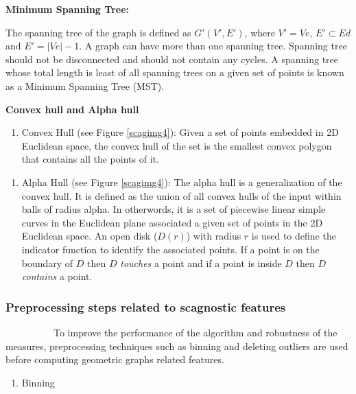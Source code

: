 \documentclass{article}
\begin{document}
\textbf{Minimum Spanning Tree:}

The spanning tree of the graph is defined as \(G'(V',E')\), where
\(V' = Ve\), \(E' \subset Ed\) and \(E' = |Ve|-1\). A graph can have
more than one spanning tree. Spanning tree should not be disconnected
and should not contain any cycles. A spanning tree whose total length is
least of all spanning trees on a given set of points is known as a
Minimum Spanning Tree (MST).

\textbf{Convex hull and Alpha hull}

\begin{enumerate}
\def\labelenumi{\roman{enumi})}
\tightlist
\item
  Convex Hull (see Figure \ref{scagimg4}): Given a set of points
  embedded in 2D Euclidean space, the convex hull of the set is the
  smallest convex polygon that contains all the points of it.
\end{enumerate}

\begin{enumerate}
\def\labelenumi{\roman{enumi})}
\setcounter{enumi}{1}
\tightlist
\item
  Alpha Hull (see Figure \ref{scagimg4}): The alpha hull is a
  generalization of the convex hull. It is defined as the union of all
  convex hulls of the input within balls of radius alpha. In otherwords,
  it is a set of piecewise linear simple curves in the Euclidean plane
  associated a given set of points in the 2D Euclidean space. An open
  disk (\(D(r)\)) with radius \(r\) is used to define the indicator
  function to identify the associated points. If a point is on the
  boundary of \(D\) then \(D\) \textit{touches} a point and if a point
  is inside \(D\) then \(D\) \textit{contains} a point.
\end{enumerate}

\hypertarget{preprocessing-steps-related-to-scagnostic-features}{%
\subsubsection{Preprocessing steps related to scagnostic
features}\label{preprocessing-steps-related-to-scagnostic-features}}

~~~~~~~~~~To improve the performance of the algorithm and robustness of
the measures, preprocessing techniques such as binning and deleting
outliers are used before computing geometric graphs related features.

\begin{enumerate}
\def\labelenumi{\roman{enumi})}
\tightlist
\item
  Binning
\end{enumerate}
\end{document}
